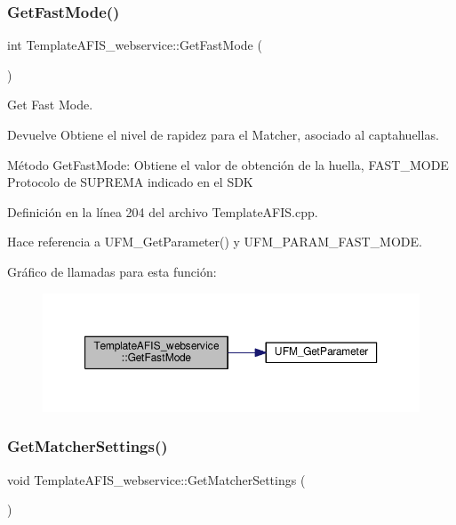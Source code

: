 \subsubsection{\texorpdfstring{Get\+Fast\+Mode()}{GetFastMode()}}
{\footnotesize\ttfamily int Template\+A\+F\+I\+S\+\_\+webservice\+::\+Get\+Fast\+Mode (\begin{DoxyParamCaption}{ }\end{DoxyParamCaption})}



Get Fast Mode. 

\begin{DoxyReturn}{Devuelve}
Obtiene el nivel de rapidez para el Matcher, asociado al captahuellas.
\end{DoxyReturn}
Método Get\+Fast\+Mode\+: Obtiene el valor de obtención de la huella, F\+A\+S\+T\+\_\+\+M\+O\+DE Protocolo de S\+U\+P\+R\+E\+MA indicado en el S\+DK 

Definición en la línea 204 del archivo Template\+A\+F\+I\+S.\+cpp.



Hace referencia a U\+F\+M\+\_\+\+Get\+Parameter() y U\+F\+M\+\_\+\+P\+A\+R\+A\+M\+\_\+\+F\+A\+S\+T\+\_\+\+M\+O\+DE.

Gráfico de llamadas para esta función\+:\nopagebreak
\begin{figure}[H]
\begin{center}
\leavevmode
\includegraphics[width=350pt]{classTemplateAFIS__webservice_a4842d911ed73f5c33bf5150a6e3bcad4_cgraph}
\end{center}
\end{figure}
\hypertarget{classTemplateAFIS__webservice_ac6ac32ddd0df850b0e25aa0943c39113}{}\label{classTemplateAFIS__webservice_ac6ac32ddd0df850b0e25aa0943c39113} 
\subsubsection{\texorpdfstring{Get\+Matcher\+Settings()}{GetMatcherSettings()}}
{\footnotesize\ttfamily void Template\+A\+F\+I\+S\+\_\+webservice\+::\+Get\+Matcher\+Settings (\begin{DoxyParamCaption}{ }\end{DoxyParamCaption})}



